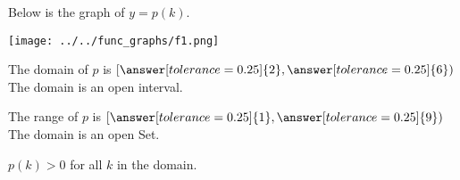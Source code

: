 \documentclass{ximera}
\author{Lee Wayand}
\begin{document}
\begin{exercise}  





Below is the graph of $y=p(k)$.  

\begin{image}
\texttt{[image: ../../func\_graphs/f1.png]}
\end{image}









\begin{question} 


The domain of $p$ is  $\left[ \answer[tolerance=0.25]{2}, \answer[tolerance=0.25]{6} \right)$  \\


The domain is an open interval.
\begin{multipleChoice}
\end{multipleChoice}

\end{question}






\begin{question} 


The range of $p$ is $\left[ \answer[tolerance=0.25]{1}, \answer[tolerance=0.25]{9} \right)$ \\


The domain is an open Set.
\begin{multipleChoice}
\end{multipleChoice}


\end{question}






\begin{question} 



$p(k) > 0$ for all $k$ in the domain. 
\begin{multipleChoice}
\end{multipleChoice}

\end{question}








\end{exercise}
\end{document}
